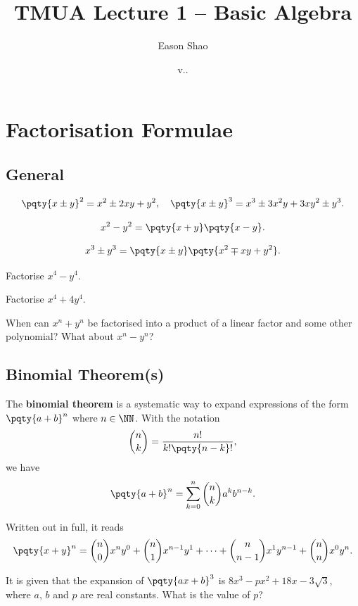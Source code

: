 \documentclass{article}
\title{TMUA Lecture 1 -- Basic Algebra}
\author{Eason Shao}
\date{v.\DATE.\COMMITSHA}
\begin{document}
\maketitle

\tableofcontents

\section{Factorisation Formulae}
\subsection{General}
\[
    \pqty{x \pm y}^2 = x^2 \pm 2xy + y^2, \quad \pqty{x \pm y}^3 = x^3 \pm 3 x^2 y + 3 x y^2 \pm y^3.
\]

\[
    x^2 - y^2 = \pqty{x + y} \pqty{x - y}.
\]

\[
    x^3 \pm y^3 = \pqty{x \pm y} \pqty{x^2 \mp xy + y^2}.
\]

\begin{example}
    Factorise \(x^4 - y^4\).
\end{example}

\begin{example}
    Factorise \(x^4 + 4 y^4\).
\end{example}

\begin{problem}
    When can \(x^n + y^n\) be factorised into a product of a linear factor and some other polynomial? What about \(x^n - y^n\)?
\end{problem}

\subsection{Binomial Theorem(s)}
The \textbf{binomial theorem} is a systematic way to expand expressions of the form \(\pqty{a + b}^n\) where \(n \in \NN\). With the notation
\[
    \binom{n}{k} = \frac{n!}{k! \pqty{n - k}!},
\]
we have
\[
    \pqty{a + b}^n = \sum_{k = 0}^{n} \binom{n}{k} a^k b^{n - k}.
\]

Written out in full, it reads
\[
    \pqty{x + y}^n = \binom{n}{0} x^n y^0 + \binom{n}{1} x^{n - 1} y^1 + \cdots + \binom{n}{n - 1} x^1 y^{n - 1} + \binom{n}{n} x^0 y^n.
\]

\begin{example}[TMUA 2016 P1 Q1]
    It is given that the expansion of \(\pqty{ax + b}^3\) is \(8 x^3 - p x^2 + 18 x - 3 \sqrt{3}\), where \(a\), \(b\) and \(p\) are real constants. What is the value of \(p\)?
\end{example}
\end{document}
